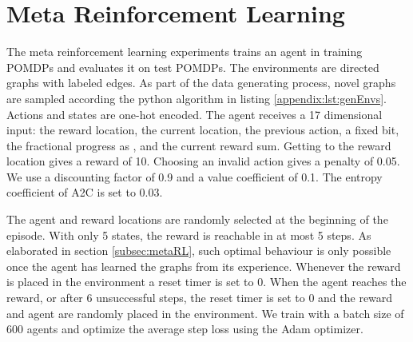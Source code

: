 \documentclass{article} \usepackage{iclr2021_conference,times}
\begin{document}
\newpage
\section{Meta Reinforcement Learning}
\label{appendix:sec:metaRL}
The meta reinforcement learning experiments trains an agent in training POMDPs and evaluates it on test POMDPs.
The environments are directed graphs with labeled edges. 
As part of the data generating process, novel graphs are sampled according the python algorithm in listing \ref{appendix:lst:genEnvs}.
Actions and states are one-hot encoded. The agent receives a 17 dimensional input: the reward location, the current location, the previous action, a fixed bit, the fractional progress as , and the current reward sum. Getting to the reward location gives a reward of 10. Choosing an invalid action gives a penalty of 0.05. We use a discounting factor of 0.9 and a value coefficient of 0.1. The entropy coefficient of A2C is set to 0.03.

The agent and reward locations are randomly selected at the beginning of the episode. With only 5 states, the reward is reachable in at most 5 steps. As elaborated in section \ref{subsec:metaRL}, such optimal behaviour is only possible once the agent has learned the graphs from its experience. Whenever the reward is placed in the environment a reset timer is set to 0. When the agent reaches the reward, or after 6 unsuccessful steps, the reset timer is set to 0 and the reward and agent are randomly placed in the environment. We train with a batch size of 600 agents and optimize the average step loss using the Adam optimizer.
\end{document}
